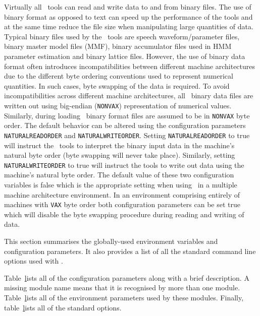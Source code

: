 Virtually all \HTK\ tools can read and write data to and from binary files. The
use of binary format as opposed to text can speed up the performance of the
tools and at the same time reduce the file size when manipulating large
quantities of data.  Typical binary files used by the \HTK\ tools are speech
waveform/parameter files, binary master model files (MMF), binary accumulator
files used in HMM parameter estimation and binary lattice files. However, the
use of binary data format often introduces incompatibilities between different
machine architectures due to the different byte ordering conventions used to
represent numerical quantities. In such cases, byte swapping of the data is
required. To avoid incompatibilities across different machine architectures,
all \HTK\ binary data files are written out using big-endian (\texttt{NONVAX})
representation of numerical values. Similarly, during loading \HTK\ binary
format files are assumed to be in \texttt{NONVAX} byte order. The default
behavior can be altered using the configuration parameters
\texttt{NATURALREADORDER} and
\texttt{NATURALWRITEORDER}. Setting \texttt{NATURALREADORDER} to true will
instruct the \HTK\ tools to interpret the binary input data in the machine's
natural byte order (byte swapping will never take place). Similarly, setting
\texttt{NATURALWRITEORDER} to true will instruct the tools to write out data
using the machine's natural byte order. The default value of these two
configuration variables is false which is the appropriate setting when using
\HTK\ in a multiple machine architecture environment. In an environment
comprising entirely of machines with \texttt{VAX} byte order both configuration
parameters can be set true which will disable the byte swapping procedure
during reading and writing of data.


This section summarises the globally-used environment
variables and configuration
parameters. It
also provides a list of all the standard command line options used
with \HTK.

Table~\href{t:openvcparms} lists all of the configuration parameters
along with a brief description.  A missing module name means that it
is recognised by more than one module. Table~\href{t:openvars} lists
all of the environment parameters used by these modules.  Finally,
table~\href{t:stdopts} lists all of the standard options.

